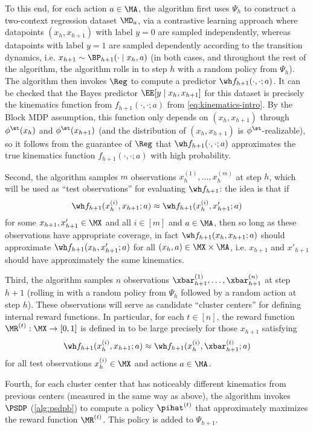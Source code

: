 To this end, for each action $a \in \MA$, the algorithm first uses $\Psi_h$ to construct a two-context regression dataset $\MD_a$, via a contrastive learning approach where datapoints $(x_h,x_{h+1})$ with label $y=0$ are sampled independently, whereas datapoints with label $y=1$ are sampled dependently according to the transition dynamics, i.e. $x_{h+1} \sim \BP_{h+1}(\cdot\mid{}x_h,a)$ (in both cases, and throughout the rest of the algorithm, the algorithm rolls in to step $h$ with a random policy from $\Psi_h$). The algorithm then invokes $\Reg$ to compute a predictor $\wh f_{h+1}(\cdot,\cdot;a)$. It can be checked that the Bayes predictor $\EE[y\mid{}x_h,x_{h+1}]$ for this dataset is precisely the kinematics function from $f_{h+1}(\cdot,\cdot;a)$ from \cref{eq:kinematics-intro}. By the Block MDP assumption, this function only depends on $(x_h,x_{h+1})$ through $\phi^\st(x_h)$ and $\phi^\st(x_{h+1})$ (and the distribution of $(x_h,x_{h+1})$ is $\phi^\st$-realizable), so it follows from the guarantee of $\Reg$ that $\wh f_{h+1}(\cdot,\cdot;a)$ approximates the true kinematics function $f_{h+1}(\cdot,\cdot;a)$ with high probability.

Second, the algorithm samples $m$ observations $x_h^{(1)},\dots,x_h^{(m)}$ at step $h$, which will be used as ``test observations'' for evaluating $\wh f_{h+1}$: the idea is that if 
\[\wh f_{h+1}(x_h^{(i)}, x_{h+1};a) \approx \wh f_{h+1}(x_h^{(i)}, x'_{h+1};a)\]
for some $x_{h+1},x'_{h+1}\in\MX$ and all $i \in [m]$ and $a \in \MA$, then so long as these observations have appropriate coverage, in fact $\wh f_{h+1}(x_h,x_{h+1};a)$ should approximate $\wh f_{h+1}(x_h,x'_{h+1};a)$ for all $(x_h,a) \in \MX\times\MA$, i.e. $x_{h+1}$ and $x'_{h+1}$ should have approximately the same kinematics.

Third, the algorithm samples $n$ observations $\xbar_{h+1}^{(1)},\dots,\xbar_{h+1}^{(n)}$ at step $h+1$ (rolling in with a random policy from $\Psi_h$ followed by a random action at step $h$). These observations will serve as candidate ``cluster centers'' for defining internal reward functions. In particular, for each $t \in [n]$, the reward function $\MR^{(t)}:\MX\to[0,1]$ is defined in  to be large precisely for those $x_{h+1}$ satisfying
\[\wh f_{h+1}(x_h^{(i)}, x_{h+1};a) \approx \wh f_{h+1}(x_h^{(i)}, \xbar_{h+1}^{(t)};a)\]
for all test observations $x_h^{(i)} \in \MX$ and actions $a \in \MA$.

Fourth, for each cluster center that has noticeably different kinematics from previous centers (measured in the same way as above), the algorithm invokes $\PSDP$ (\cref{alg:psdpb}) to compute a policy $\pihat^{(t)}$ that approximately maximizes the reward function $\MR^{(t)}$. This policy is added to $\Psi_{h+1}$.

